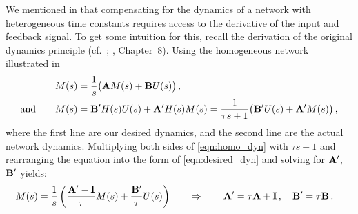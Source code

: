 We mentioned in  that compensating for the dynamics of a network with heterogeneous time constants requires access to the derivative of the input and feedback signal.
To get some intuition for this, recall the derivation of the original \NEF dynamics principle (cf.~; \cite{eliasmith2003neural}, Chapter~8).
Using the homogeneous network illustrated in 
\begin{align}
	M(s) &= \frac{1}{s} \bigl( \mathbf{A} M(s) + \mathbf{B} U(s) \bigr) \,, \label{eqn:desired_dyn}\\
	\text{and} \quad\quad M(s) &= \mathbf{B}' H(s) U(s) + \mathbf{A}' H(s) M(s) = \frac{1}{\tau s + 1} \bigl( \mathbf{B}' U(s) + \mathbf{A}' M(s) \bigr) \label{eqn:homo_dyn}\,,
\end{align}
where the first line are our desired dynamics, and the second line are the actual network dynamics.
Multiplying both sides of \cref{eqn:homo_dyn} with $\tau s + 1$ and rearranging the equation into the form of \cref{eqn:desired_dyn} and solving for $\mathbf{A}'$, $\mathbf{B}'$ yields:
\begin{align*}
	M(s) &= \frac{1}{s} \left( \frac{\mathbf{A}' - \mathbf{I}}{\tau} M(s) +  \frac{\mathbf{B}'}{\tau}  U(s) \right) \quad\quad \Rightarrow \quad\quad \mathbf{A}' = \tau \mathbf{A} + \mathbf{I} \,, \quad \mathbf{B}' = \tau \mathbf{B} \,.
\end{align*}

